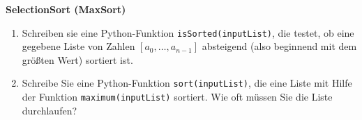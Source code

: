 \textbf{SelectionSort (MaxSort)}
\begin{enumerate}
	\item Schreiben sie eine Python-Funktion \verb|isSorted(inputList)|, die testet, ob eine gegebene Liste von Zahlen $[a_0, \dots, a_{n-1}]$ absteigend (also beginnend mit dem größten Wert) sortiert ist.
	\item Schreibe Sie eine Python-Funktion \verb|sort(inputList)|, die eine Liste mit Hilfe der Funktion \texttt{maximum(inputList)} sortiert. Wie oft müssen Sie die Liste durchlaufen?
\end{enumerate}